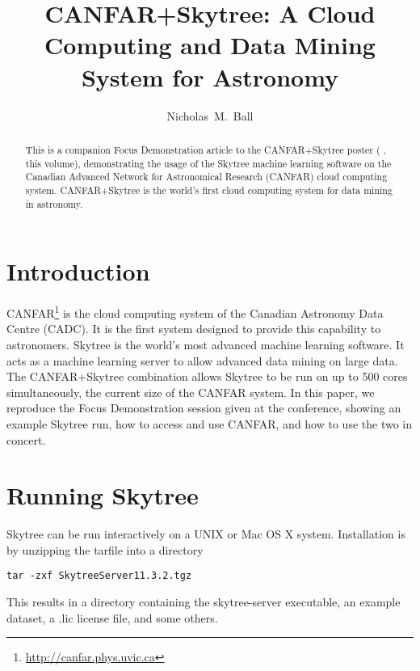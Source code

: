 
\resetcounters




\title{CANFAR+Skytree: A Cloud Computing and Data Mining System for Astronomy}
\author{Nicholas~M.~Ball
}


\begin{abstract}
This is a companion Focus Demonstration article to the CANFAR+Skytree poster (\citeauthor{ball:adass12poster} \citeyear{ball:adass12poster}, this volume), demonstrating the usage of the Skytree machine learning software on the Canadian Advanced Network for Astronomical Research (CANFAR) cloud computing system. CANFAR+Skytree is the world's first cloud computing system for data mining in astronomy.
\end{abstract}

\section{Introduction}

CANFAR\footnote{\url{http://canfar.phys.uvic.ca}} \citep{gaudet:canfar} is the cloud computing system of the Canadian Astronomy Data Centre (CADC). It is the first system designed to provide this capability to astronomers. Skytree is the world's most advanced machine learning software. It acts as a machine learning server to allow advanced data mining on large data. The CANFAR+Skytree combination allows Skytree to be run on up to 500 cores simultaneously, the current size of the CANFAR system. In this paper, we reproduce the Focus Demonstration session given at the conference, showing an example Skytree run, how to access and use CANFAR, and how to use the two in concert.

\section{Running Skytree}

Skytree can be run interactively on a UNIX or Mac OS X system. Installation is by unzipping the tarfile into a directory

\begin{verbatim}
tar -zxf SkytreeServer11.3.2.tgz
\end{verbatim}

This results in a directory containing the skytree-server executable, an example dataset, a .lic license file, and some others.

